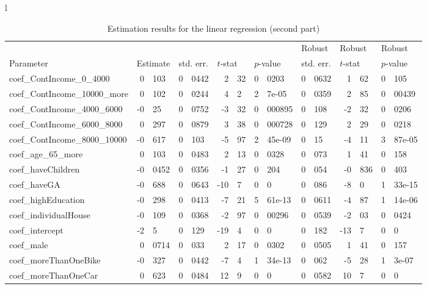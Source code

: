 \documentclass[12pt,a4paper]{article}
\begin{document}
\begin{sidewaystable}[htb]
\caption{\label{tab:regression2}Estimation results for the linear
  regression (second part)}
  \begin{tabular}{l}
\begin{tabular}{lr@{.}lr@{.}lr@{.}lr@{.}lr@{.}lr@{.}lr@{.}l}
                      &   \multicolumn{2}{l}{}    & \multicolumn{2}{l}{} & \multicolumn{2}{l}{}  &     \multicolumn{2}{l}{} &   \multicolumn{2}{l}{Robust}    & \multicolumn{2}{l}{Robust}  &     \multicolumn{2}{l}{Robust}   \\
Parameter      & \multicolumn{2}{l}{Estimate}  &
\multicolumn{2}{l}{std. err.}  &  \multicolumn{2}{l}{$t$-stat}  &   \multicolumn{2}{l}{$p$-value}  &
\multicolumn{2}{l}{std. err.}  &  \multicolumn{2}{l}{$t$-stat}  &   \multicolumn{2}{l}{$p$-value}   \\

\hline
coef\_ContIncome\_0\_4000     &   0&103 &   0&0442 &    2&32 &   0&0203 &        0&0632 &         1&62 &         0&105 \\
coef\_ContIncome\_10000\_more &   0&102 &   0&0244 &     4&2 &  2&7e-05 &        0&0359 &         2&85 &       0&00439 \\
coef\_ContIncome\_4000\_6000  &   -0&25 &   0&0752 &   -3&32 & 0&000895 &         0&108 &        -2&32 &        0&0206 \\
coef\_ContIncome\_6000\_8000  &   0&297 &   0&0879 &    3&38 & 0&000728 &         0&129 &         2&29 &        0&0218 \\
coef\_ContIncome\_8000\_10000 &  -0&617 &    0&103 &   -5&97 & 2&45e-09 &          0&15 &        -4&11 &      3&87e-05 \\
coef\_age\_65\_more           &   0&103 &   0&0483 &    2&13 &   0&0328 &         0&073 &         1&41 &         0&158 \\
coef\_haveChildren          & -0&0452 &   0&0356 &   -1&27 &    0&204 &         0&054 &       -0&836 &         0&403 \\
coef\_haveGA                &  -0&688 &   0&0643 &   -10&7 &      0&0 &         0&086 &         -8&0 &      1&33e-15 \\
coef\_highEducation         &  -0&298 &   0&0413 &   -7&21 & 5&61e-13 &        0&0611 &        -4&87 &      1&14e-06 \\
coef\_individualHouse       &  -0&109 &   0&0368 &   -2&97 &  0&00296 &        0&0539 &        -2&03 &        0&0424 \\
coef\_intercept             &    -2&5 &    0&129 &   -19&4 &      0&0 &         0&182 &        -13&7 &           0&0 \\
coef\_male                  &  0&0714 &    0&033 &    2&17 &   0&0302 &        0&0505 &         1&41 &         0&157 \\
coef\_moreThanOneBike       &  -0&327 &   0&0442 &    -7&4 & 1&34e-13 &         0&062 &        -5&28 &       1&3e-07 \\
coef\_moreThanOneCar        &   0&623 &   0&0484 &    12&9 &      0&0 &        0&0582 &         10&7 &           0&0 \\


\end{tabular}
\end{tabular}
\end{sidewaystable}
\end{document}
